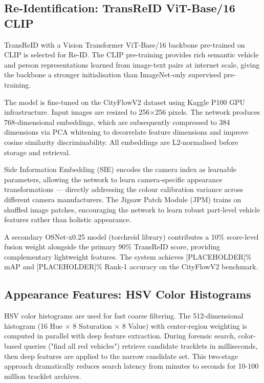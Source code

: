 \subsection{Re-Identification: TransReID ViT-Base/16 CLIP}

TransReID with a Vision Transformer ViT-Base/16 backbone pre-trained on CLIP is selected for Re-ID. The CLIP pre-training provides rich semantic vehicle and person representations learned from image-text pairs at internet scale, giving the backbone a stronger initialisation than ImageNet-only supervised pre-training.

The model is fine-tuned on the CityFlowV2 dataset using Kaggle P100 GPU infrastructure. Input images are resized to 256$\times$256 pixels. The network produces 768-dimensional embeddings, which are subsequently compressed to 384 dimensions via PCA whitening to decorrelate feature dimensions and improve cosine similarity discriminability. All embeddings are L2-normalised before storage and retrieval.

Side Information Embedding (SIE) encodes the camera index as learnable parameters, allowing the network to learn camera-specific appearance transformations — directly addressing the colour calibration variance across different camera manufacturers. The Jigsaw Patch Module (JPM) trains on shuffled image patches, encouraging the network to learn robust part-level vehicle features rather than holistic appearance.

A secondary OSNet-x0.25 model (torchreid library) contributes a 10\% score-level fusion weight alongside the primary 90\% TransReID score, providing complementary lightweight features. The system achieves [PLACEHOLDER]\% mAP and [PLACEHOLDER]\% Rank-1 accuracy on the CityFlowV2 benchmark.

\subsection{Appearance Features: HSV Color Histograms}

HSV color histograms are used for fast coarse filtering. The 512-dimensional histogram (16 Hue × 8 Saturation × 8 Value) with center-region weighting is computed in parallel with deep feature extraction. During forensic search, color-based queries ("find all red vehicles") retrieve candidate tracklets in milliseconds, then deep features are applied to the narrow candidate set. This two-stage approach dramatically reduces search latency from minutes to seconds for 10-100 million tracklet archives.


